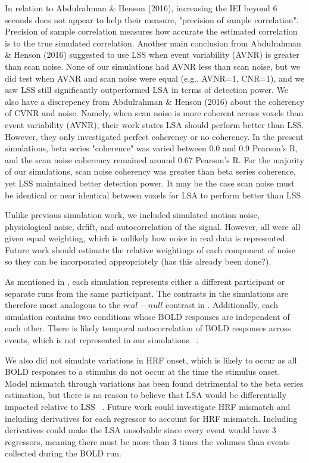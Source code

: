 \documentclass[10pt,letterpaper]{article}
\begin{document}
In relation to Abdulrahman \& Henson (2016)\cite{Abdulrahman2016}, increasing
the IEI beyond 6 seconds does not appear to help their measure, "precision of sample correlation".
Precision of sample correlation measures how accurate the estimated correlation is to the true
simulated correlation.
Another main conclusion from Abdulrahman \& Henson (2016)\cite{Abdulrahman2016} suggested to
use LSS when event variability (AVNR) is greater than scan noise.
None of our simulations had AVNR less than scan noise, but we did test
when AVNR and scan noise were equal (e.g., AVNR=1, CNR=1), and we saw
LSS still significantly outperformed LSA in terms of detection power.
We also have a discrepency from Abdulrahman \& Henson (2016)\cite{Abdulrahman2016}
about the coherency of CVNR and noise.
Namely, when scan noise is more coherent across voxels than event variability (AVNR),
their work states LSA should perform better than LSS.
However, they only investigated perfect coherency or no coherency.
In the present simulations, beta series "coherence" was varied between 0.0 and 0.9 Pearson's R,
and the scan noise coherency remained around 0.67 Pearson's R.
For the majority of our simulations, scan noise coherency was greater than beta series
coherence, yet LSS maintained better detection power.
It may be the case scan noise must be identical or near identical between voxels
for LSA to perform better than LSS.

Unlike previous simulation work, we included simulated
motion noise, physiological noise, drfift, and autocorrelation of the signal.
However, all were all given equal weighting, which is unlikely how noise in real data
is represented.
Future work should estimate the relative weightings of each component of noise
so they can be incorporated appropriately (has this already been done?).

As mentioned in , each simulation represents
either a different participant or separate runs from the same participant.
The contrasts in the simulations are therefore most analogous to the $real - null$
contrast in .
Additionally, each simulation contains two conditions whose BOLD responses
are independent of each other.
There is likely temporal autocorrelation of BOLD responses across events,
which is not represented in our simulations ~\cite{Abdulrahman2016}.

We also did not simulate variations in HRF onset, which is likely to occur
as all BOLD responses to a stimulus do not occur at the time the stimulus onset.
Model mismatch through variations has been found detrimental to the beta series estimation, 
but there is no reason to believe that LSA would be differentially impacted relative to LSS ~\cite{Turner2012a}.
Future work could investigate HRF mismatch and including derivatives for each regressor to account for
HRF mismatch.
Including derivatives could make the LSA unsolvable since every event would have 3 regressors, meaning
there must be more than 3 times the volumes than events collected during the BOLD run.
\end{document}
